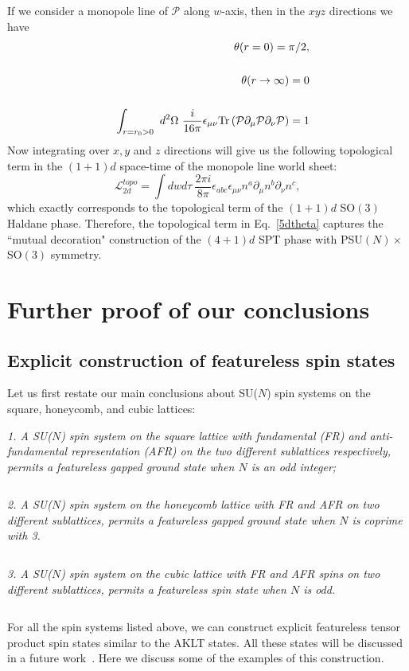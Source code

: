 \documentclass[aps,prb,twocolumn,superscriptaddress,showpacs]{revtex4}
\newcommand{\Tr}{\mathop{\mathrm{Tr}}}
\newcommand{\beq}{\begin{equation}}
\newcommand{\eeq}{\end{equation}}
\newcommand{\beqn}{\begin{eqnarray}}
\newcommand{\eeqn}{\end{eqnarray}}
\def\Tr{\text{Tr}}
\begin{document}
If we consider a monopole line of $\mathcal{P}$ along $w$-axis,
then in the $xyz$ directions we have \beqn &&\theta(r=0)=\pi/2,
\cr \cr && \theta(r\rightarrow\infty)=0 \cr\cr &&\int_{r=r_0>0} \
d^2\Omega \
\frac{i}{16\pi}\epsilon_{\mu\nu}\Tr\left(\mathcal{P}\partial_{\mu}\mathcal{P}\partial_{\nu}\mathcal{P}\right)=1
\eeqn Now integrating over $x, y$ and $z$ directions will give us
the following topological term in the $(1+1)d$ space-time of the
monopole line world sheet: \beq \mathcal{L}^{topo}_{2d} = \int
dwd\tau \ \frac{2\pi
i}{8\pi}\epsilon_{abc}\epsilon_{\mu\nu}n^a\partial_{\mu}n^b\partial_{\nu}n^c,
\eeq which exactly corresponds to the topological term of the
$(1+1)d$ SO$(3)$ Haldane phase. Therefore, the topological term in
Eq.~\ref{5dtheta} captures the ``mutual decoration" construction
of the $(4+1)d$ SPT phase with PSU$(N)\times$SO$(3)$ symmetry.

\section{Further proof of our conclusions}

\subsection{Explicit construction of featureless spin states}

Let us first restate our main conclusions about SU($N$) spin
systems on the square, honeycomb, and cubic lattices:

{\it 1. A SU($N$) spin system on the square lattice with
fundamental (FR) and anti-fundamental representation (AFR) on the
two different sublattices respectively, permits a featureless
gapped ground state when $N$ is an odd integer;}

$ $

{\it 2. A SU($N$) spin system on the honeycomb lattice with FR and
AFR on two different sublattices, permits a featureless gapped
ground state when $N$ is coprime with 3.}

$ $

{\it 3. A SU($N$) spin system on the cubic lattice with FR and AFR
spins on two different sublattices, permits a featureless spin
state when $N$ is odd.}

$ $

For all the spin systems listed above, we can construct explicit
featureless tensor product spin states similar to the AKLT states.
All these states will be discussed in a future
work~\cite{jianfuture}. Here we discuss some of the examples of
this construction.
\end{document}
